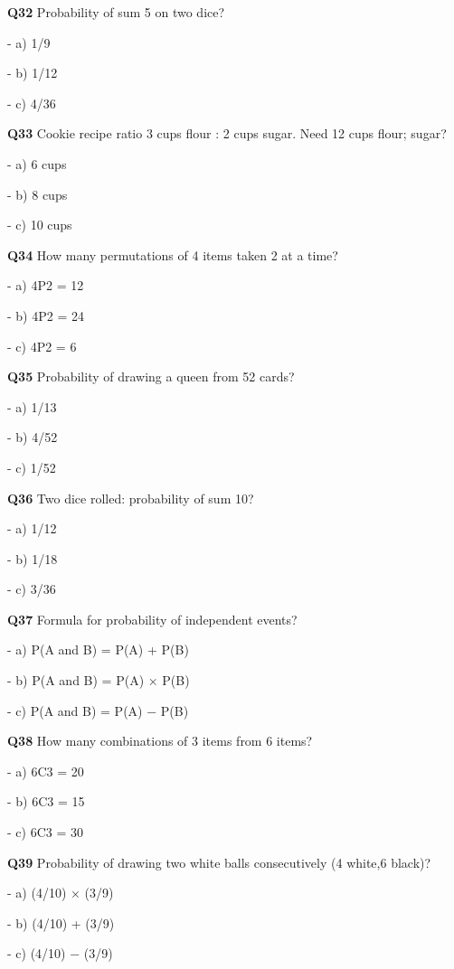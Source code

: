 \textbf{Q32} Probability of sum 5 on two dice?\par
\quad - a) 1/9\par
\quad - b) 1/12\par
\quad - c) 4/36\par

\textbf{Q33} Cookie recipe ratio 3 cups flour : 2 cups sugar. Need 12 cups flour; sugar?\par
\quad - a) 6 cups\par
\quad - b) 8 cups\par
\quad - c) 10 cups\par

\textbf{Q34} How many permutations of 4 items taken 2 at a time?\par
\quad - a) 4P2 = 12\par
\quad - b) 4P2 = 24\par
\quad - c) 4P2 = 6\par

\textbf{Q35} Probability of drawing a queen from 52 cards?\par
\quad - a) 1/13\par
\quad - b) 4/52\par
\quad - c) 1/52\par

\textbf{Q36} Two dice rolled: probability of sum 10?\par
\quad - a) 1/12\par
\quad - b) 1/18\par
\quad - c) 3/36\par

\textbf{Q37} Formula for probability of independent events?\par
\quad - a) P(A and B) = P(A) + P(B)\par
\quad - b) P(A and B) = P(A) × P(B)\par
\quad - c) P(A and B) = P(A) − P(B)\par

\textbf{Q38} How many combinations of 3 items from 6 items?\par
\quad - a) 6C3 = 20\par
\quad - b) 6C3 = 15\par
\quad - c) 6C3 = 30\par

\textbf{Q39} Probability of drawing two white balls consecutively (4 white,6 black)?\par
\quad - a) (4/10) × (3/9)\par
\quad - b) (4/10) + (3/9)\par
\quad - c) (4/10) − (3/9)\par


